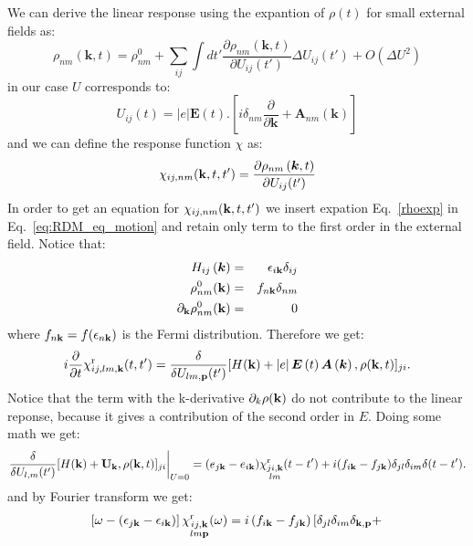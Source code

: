 \documentclass[preprint,showpacs,prb,superscriptaddress,aps,floatfix]{revtex4-1}
\newcommand{\pp}{{\bf p}}
\newcommand{\kk}{{\bf k}}
\newcommand{\UU}{{\bf U}}
\newcommand{\be}{\begin{equation}}
\newcommand{\ee}{\end{equation}}
\newcommand{\bea}{\begin{eqnarray}}
\newcommand{\eea}{\end{eqnarray}}
\newcommand{\bean}{\begin{eqnarray*}}
\newcommand{\eean}{\end{eqnarray*}}
\renewcommand{\[}{\left[}
\renewcommand{\]}{\right]}
\renewcommand{\(}{\left(}
\renewcommand{\)}{\right)}
\begin{document}
We can derive the linear response using the expantion of $\rho(t)$ for small external fields as:
\be
\rho_{nm}\left(\boldsymbol{k},t\right) = \rho^0_{nm} + \sum_{ij} \int dt' \frac{\partial \rho_{nm}\left(\boldsymbol{k},t\right)}{\partial U_{ij}(t')} \Delta U_{ij}(t') + O(\Delta U^2) 
\label{rhoexp}
\ee
in our case $U$ corresponds to:
\be
 U_{ij}(t) = \left|e\right|\boldsymbol{E}\left(t\right).\left[i\delta_{nm}\frac{\partial}{\partial\boldsymbol{k}}+\boldsymbol{A}_{nm}\left(\boldsymbol{k}\right)\right]
\ee
and we can define the response function $\chi$ as:
\be
\chi_{ij,nm}(\kk,t,t')= \frac{\partial \rho_{nm}\left(\boldsymbol{k},t\right)}{\partial U_{ij}(t')} 
\ee
In order to get an equation for $\chi_{ij,nm}(\kk,t,t')$ we insert expation Eq.~\ref{rhoexp} in Eq.~\ref{eq:RDM_eq_motion} and retain only term to the first order in the external field. Notice that:
\bea
H_{ij}\left(\boldsymbol{k}\right) &=& \epsilon_{i \kk} \delta_{ij} \\
\rho^0_{nm}(\kk) &=& f_{n \kk} \delta_{nm} \\
\partial_\kk \rho^0_{nm}(\kk) &=& 0 
\eea
where $f_{n\kk}=f(\epsilon_{n \kk})$ is the Fermi distribution. Therefore we get:
\bea
\label{dtGtt}
i \frac{\partial}{\partial t} \chi^{\mathrm r}_{\substack{ij,lm, \kk }}(t,t^\prime)=\frac{\delta}{ \delta U_{lm, \pp}(t^{\prime})} [H({\kk}) + \left|e\right|\boldsymbol{E}\left(t\right) \boldsymbol{A}\left(\boldsymbol{k}\right) , \rho(\kk,t) ]_{\substack{ji}}. 
\eea
Notice that the term with the k-derivative $\partial_k \rho(\kk)$ do not contribute to the linear reponse, because it gives a contribution of the second order in $E$. Doing some math we get:
\bean
\label{diag_contr}
\left. \frac{\delta}{ \delta U_{l,m}(t^{\prime})} [H(\kk)+ \UU_{\kk},\rho(\kk,t)]_{\substack{ji}} \right\vert_{U=0}=
(e_{j\kk} - e_{i\kk})  \chi^{\mathrm r}_{\substack{ji, \kk \\ lm }}(t-t^\prime) + i(f_{i\kk}-f_{j\kk})\delta_{jl}\delta_{im} \delta(t-t'). 
\eean
and by Fourier transform we get:
\bea
 \left[  \omega- \left(\epsilon_{j \kk} -\epsilon_{i \kk}\right) \right] \chi^{\mathrm r}_{\substack{ij,\kk\\lm \mathbf p}}(\omega) = i \(f_{i \kk}-f_{j \kk}\) \left[ \delta_{jl} \delta_{im} \delta_{\kk,\pp} + \right.
\eea



\end{document}
